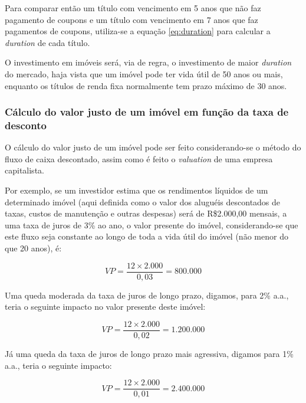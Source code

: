 \documentclass[
	12pt,				%
	oneside,			%
	a4paper,			%
	chapter=TITLE,		%
	section=TITLE,		%
	english,			%
	brazil				%
	]{abntex2}
\begin{document}
Para comparar então um título com vencimento em 5 anos que não faz pagamento de
coupons e um título com vencimento em 7 anos que faz pagamentos de coupons,
utiliza-se a equação \eqref{eq:duration} para calcular a \emph{duration} de cada
título.

O investimento em imóveis será, via de regra, o investimento de maior \emph{duration}
do mercado, haja vista que um imóvel pode ter vida útil de 50 anos ou mais,
enquanto os títulos de renda fixa normalmente tem prazo máximo de 30 anos.

\hypertarget{cuxe1lculo-do-valor-justo-de-um-imuxf3vel-em-funuxe7uxe3o-da-taxa-de-desconto}{%
\subsubsection{Cálculo do valor justo de um imóvel em função da taxa de desconto}\label{cuxe1lculo-do-valor-justo-de-um-imuxf3vel-em-funuxe7uxe3o-da-taxa-de-desconto}}

O cálculo do valor justo de um imóvel pode ser feito considerando-se o método
do fluxo de caixa descontado, assim como é feito o \emph{valuation} de uma empresa
capitalista.

Por exemplo, se um investidor estima que os rendimentos líquidos de um
determinado imóvel (aqui definida como o valor dos aluguéis descontados de
taxas, custos de manutenção e outras despesas) será de R\$2.000,00 mensais, a uma
taxa de juros de 3\% ao ano, o valor presente do imóvel, considerando-se que este
fluxo seja constante ao longo de toda a vida útil do imóvel (não menor do que 20
anos), é:

\[VP = \frac{12 \times 2.000}{0,03} = 800.000\]

Uma queda moderada da taxa de juros de longo prazo, digamos, para 2\% a.a.,
teria o seguinte impacto no valor presente deste imóvel:

\[VP = \frac{12 \times 2.000}{0,02} = 1.200.000\]

Já uma queda da taxa de juros de longo prazo mais agressiva, digamos para 1\%
a.a., teria o seguinte impacto:

\[VP = \frac{12 \times 2.000}{0,01} = 2.400.000\]
\end{document}
